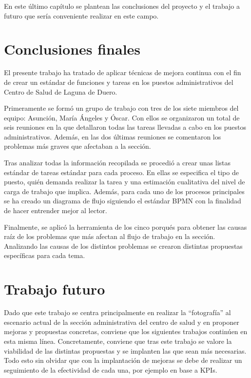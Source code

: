 En este último capítulo se plantean las conclusiones del proyecto y el trabajo a futuro que sería conveniente realizar en este campo.

\section{Conclusiones finales}

El presente trabajo ha tratado de aplicar técnicas de mejora continua con el fin de crear un estándar de funciones y tareas en los puestos administrativos del Centro de Salud de Laguna de Duero.

Primeramente se formó un grupo de trabajo con tres de los siete miembros del equipo: Asunción, María Ángeles y Óscar.
Con ellos se organizaron un total de seis reuniones en la que detallaron todas las tareas llevadas a cabo en los puestos administrativos. Además, en las dos últimas reuniones se comentaron los problemas más graves que afectaban a la sección.

Tras analizar todas la información recopilada se procedió a crear unas listas estándar de tareas estándar para cada proceso.
En ellas se especifica el tipo de puesto, quién demanda realizar la tarea y una estimación cualitativa del nivel de carga de trabajo que implica.
Además, para cada uno de los procesos principales se ha creado un diagrama de flujo siguiendo el estándar BPMN con la finalidad de hacer entrender mejor al lector.

Finalmente, se aplicó la herramienta de los cinco porqués para obtener las causas raíz de los problemas que más afectan al flujo de trabajo en la sección.
Analizando las causas de los distintos problemas se crearon distintas propuestas específicas para cada tema.

\section{Trabajo futuro}

Dado que este trabajo se centra principalmente en realizar la ``fotografía'' al escenario actual de la sección administrativa del centro de salud y en proponer mejoras y propuestas concretas, conviene que los siguientes trabajos continúen en esta misma línea.
Concretamente, conviene que tras este trabajo se valore la viabilidad de las distintas propuestas y se implanten las que sean más necesarias.
Todo esto sin olvidar que con la implantación de mejoras se debe de realizar un seguimiento de la efectividad de cada una, por ejemplo en base a KPIs.